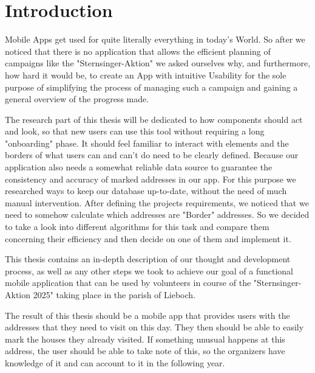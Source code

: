 \section{Introduction}


Mobile Apps get used for quite literally everything in today's World. So after we noticed that there is no application that allows the efficient planning of campaigns like the "Sternsinger-Aktion" we asked ourselves why, and furthermore, how hard it would be, to create an App with intuitive Usability for the sole purpose of simplifying the process of managing such a campaign and gaining a general overview of the progress made.

\blankLine


The research part of this thesis will be dedicated to how components should act and look, so that new users can use this tool without requiring a long "onboarding" phase. It should feel familiar to interact with elements and the borders of what users can and can't do need to be clearly defined. Because our application also needs a somewhat reliable data source to guarantee the consistency and accuracy of marked addresses in our app. For this purpose we researched ways to keep our database up-to-date, without the need of much manual intervention. After defining the projects requirements, we noticed that we need to somehow calculate which addresses are "Border" addresses. So we decided to take a look into different algorithms for this task and compare them concerning their efficiency and then decide on one of them and implement it.

\blankLine

This thesis contains an in-depth description of our thought and development
process, as well as any other steps we took to achieve our goal of a
functional mobile application that can be used by volunteers in course of the
"Sternsinger-Aktion 2025" taking place in the parish of Lieboch.

\blankLine


The result of this thesis should be a mobile app that provides users with the addresses that they need to visit on this day. They then should be able to easily mark the houses they already visited. If something unusual happens at this address, the user should be able to take note of this, so the organizers have knowledge of it and can account to it in the following year.

